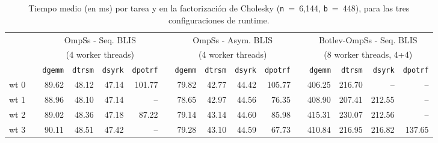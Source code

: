 \begin{table}%
\centering
	\caption{Tiempo medio (en ms) por tarea y \wt en la factorización de Cholesky ({\tt n}~=~6,144, 
{\tt b}~=~448), para las tres configuraciones de runtime.}
\label{tab:2dp_tasks}

\ca{2pt}

\renewcommand{\fg}[1]{{#1}} 
\renewcommand{\br}[1]{{#1}} 

{\scriptsize
\begin{tabular}{crrrrrrrrrrrrrrr} 
   	\toprule
                 & \phantom{a} & \multicolumn{4}{c}{OmpSs - Seq. BLIS} & \phantom{ab} & \multicolumn{4}{c}{OmpSs - Asym. BLIS} & \phantom{ab} & \multicolumn{4}{c}{Botlev-OmpSs - Seq. BLIS} \\ 
                 & \phantom{a} & \multicolumn{4}{c}{(4 worker threads)} & \phantom{ab} & \multicolumn{4}{c}{(4 worker threads)} & \phantom{ab} & \multicolumn{4}{c}{(8 worker threads, 4+4)} \\ 
                                          \cmidrule{3-6}                                         \cmidrule{8-11}                                      \cmidrule{13-16}
                       & \phantom{a} &    {\tt dgemm} & {\tt dtrsm}& {\tt dsyrk}& {\tt dpotrf}  & \phantom{ab} & {\tt dgemm}  & {\tt dtrsm} & {\tt dsyrk} & {\tt dpotrf}& \phantom{ab} & {\tt dgemm} & {\tt dtrsm} & {\tt dsyrk} & {\tt dpotrf}         \\ \hline 
	 {\sc wt 0}    & \phantom{a} &    \br{89.62} & \fg{48.12} & \fg{47.14} & \fg{101.77}    & \phantom{ab} & \fg{79.82}  & \fg{42.77}  & \fg{44.42}  & \fg{105.77}  & \phantom{ab} & \fg{406.25} & \fg{216.70} & \fg{--} & \fg{--}    \\ \cline{3-16}
	 {\sc wt 1}    & \phantom{a} &    \br{88.96} & \br{48.10} & \fg{47.14} & \fg{--}      & \phantom{ab} & \fg{78.65}  & \fg{42.97}  & \fg{44.56}  & \fg{76.35}  & \phantom{ab} & \fg{408.90} & \fg{207.41} & \fg{212.55} & \fg{--}    \\ \cline{3-16}
	 {\sc wt 2}    & \phantom{a} &    \br{89.02} & \br{48.36} & \br{47.18} & \fg{87.22}    & \phantom{ab} & \fg{79.14}  & \fg{43.14}  & \fg{44.60}  & \fg{85.98}  & \phantom{ab} & \fg{415.31} & \fg{230.07} & \fg{212.56} & \fg{--}    \\ \cline{3-16}
	 {\sc wt 3}    & \phantom{a} &    \br{90.11} & \br{48.51} & \br{47.42} & \fg{--}      & \phantom{ab} & \fg{79.28}  & \fg{43.10}  & \fg{44.59}  & \fg{67.73}  & \phantom{ab} & \fg{410.84} & \fg{216.95} & \fg{216.82} & \fg{137.65}    \\ \cline{3-16}

\end{tabular}}
\end{table}
